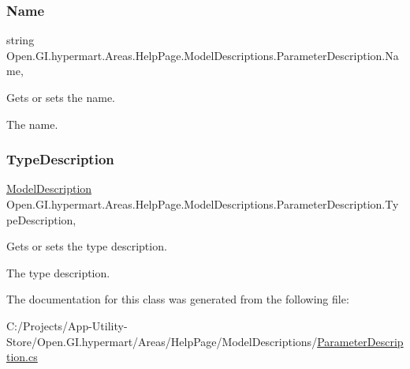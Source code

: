 \subsubsection{\texorpdfstring{Name}{Name}}
{\footnotesize\ttfamily string Open.\+G\+I.\+hypermart.\+Areas.\+Help\+Page.\+Model\+Descriptions.\+Parameter\+Description.\+Name\hspace{0.3cm}{\ttfamily [get]}, {\ttfamily [set]}}



Gets or sets the name. 

The name. \hypertarget{class_open_1_1_g_i_1_1hypermart_1_1_areas_1_1_help_page_1_1_model_descriptions_1_1_parameter_description_a175a097aa553ad65ae87f136df0e24e7}{}\label{class_open_1_1_g_i_1_1hypermart_1_1_areas_1_1_help_page_1_1_model_descriptions_1_1_parameter_description_a175a097aa553ad65ae87f136df0e24e7} 
\subsubsection{\texorpdfstring{Type\+Description}{TypeDescription}}
{\footnotesize\ttfamily \hyperlink{class_open_1_1_g_i_1_1hypermart_1_1_areas_1_1_help_page_1_1_model_descriptions_1_1_model_description}{Model\+Description} Open.\+G\+I.\+hypermart.\+Areas.\+Help\+Page.\+Model\+Descriptions.\+Parameter\+Description.\+Type\+Description\hspace{0.3cm}{\ttfamily [get]}, {\ttfamily [set]}}



Gets or sets the type description. 

The type description. 

The documentation for this class was generated from the following file\+:\begin{DoxyCompactItemize}
\item 
C\+:/\+Projects/\+App-\/\+Utility-\/\+Store/\+Open.\+G\+I.\+hypermart/\+Areas/\+Help\+Page/\+Model\+Descriptions/\hyperlink{_parameter_description_8cs}{Parameter\+Description.\+cs}\end{DoxyCompactItemize}
